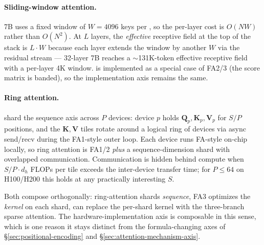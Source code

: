 \paragraph{Sliding-window attention.}  7B
\citep{jiang2023} uses a fixed window of $W = 4096$ keys per , so
the per-layer cost is $O(N W)$ rather than $O(N^2)$. At $L$ layers, the
\emph{effective} receptive field at the top of the stack is $L \cdot W$
because each layer extends the window by another $W$ via the residual
stream --- 32-layer  7B reaches a $\sim$131K-token effective
receptive field with a per-layer 4K window. 
is implemented as a special case of FA2/3 (the score matrix is
banded), so the implementation axis remains the
same.

\paragraph{Ring attention.} \citet{ring-attention-2023}
shard the sequence axis across $P$ devices: device $p$ holds
$\boldsymbol{Q}_p, \boldsymbol{K}_p, \boldsymbol{V}_p$ for $S/P$
positions, and the $\boldsymbol{K}, \boldsymbol{V}$ tiles rotate around
a logical ring of devices via async send/recv during the FA1-style
outer loop. Each device runs FA-style on-chip  locally, so ring
attention is FA1/2 \emph{plus} a sequence-dimension shard with
overlapped communication. Communication is hidden behind compute when
$S / P \cdot d_h$ FLOPs per tile exceeds the inter-device transfer
time; for $P \le 64$ on H100/H200 this holds at any practically
interesting $S$.

Both compose orthogonally: ring-attention shards \emph{sequence}, FA3
optimizes the \emph{kernel} on each shard,  can replace the
per-shard kernel with the three-branch sparse attention. The
hardware-implementation axis is composable in this sense, which is one
reason it stays distinct from the formula-changing axes of
\S\ref{sec:positional-encoding} and \S\ref{sec:attention-mechanism-axis}.

